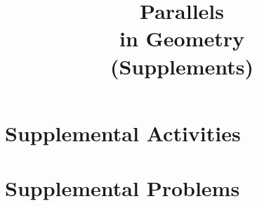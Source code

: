 \documentclass[justified,openany,nofonts]{tufte-book}
\title{Parallels \\ in Geometry \\ (Supplements)}
\author{\teachingnotes}
\renewcommand{\theenumi}{$(\mathrm{\arabic{enumi}})$}
\renewcommand{\labelenumi}{\theenumi}
\begin{document}
\def\document#1{} %
\maketitle

\setcounter{tocdepth}{1}
\tableofcontents

\setcounter{secnumdepth}{2} %


%

%

\appendix

\renewcommand{\theenumi}{$(\mathrm{\alph{enumi}})$}
\renewcommand{\labelenumi}{\theenumi}
\chapter{Supplemental Activities}







































\chapter{Supplemental Problems}




\end{document}
